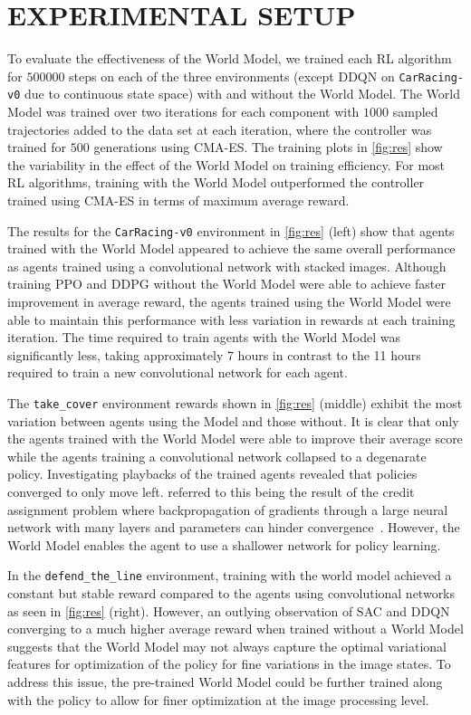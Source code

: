 \section{EXPERIMENTAL SETUP}\label{experiments}

To evaluate the effectiveness of the World Model, we trained each RL algorithm for $500000$ steps on each of the three environments (except DDQN on \texttt{CarRacing-v0} due to continuous state space) with and without the World Model. The World Model was trained over two iterations for each component with $1000$ sampled trajectories added to the data set at each iteration, where the controller was trained for $500$ generations using CMA-ES. The training plots in \cref{fig:res} show the variability in the effect of the World Model on training efficiency. For most RL algorithms, training with the World Model outperformed the controller trained using CMA-ES in terms of maximum average reward.

The results for the \texttt{CarRacing-v0} environment in \cref{fig:res} (left) show that agents trained with the World Model appeared to achieve the same overall performance as agents trained using a convolutional network with stacked images. Although training PPO and DDPG without the World Model were able to achieve faster improvement in average reward, the agents trained using the World Model were able to maintain this performance with less variation in rewards at each training iteration. The time required to train agents with the World Model was significantly less, taking approximately 7 hours in contrast to the 11 hours required to train a new convolutional network for each agent.

The \texttt{take\_cover} environment rewards shown in \cref{fig:res} (middle) exhibit the most variation between agents using the Model and those without. It is clear that only the agents trained with the World Model were able to improve their average score while the agents training a convolutional network collapsed to a degenarate policy. Investigating playbacks of the trained agents revealed that policies converged to only move left.  referred to this being the result of the credit assignment problem where backpropagation of gradients through a large neural network with many layers and parameters can hinder convergence~\cite{ha2018recurrent}. However, the World Model enables the agent to use a shallower network for policy learning.

In the \texttt{defend_the_line} environment, training with the world model achieved a constant but stable reward compared to the agents using convolutional networks as seen in \cref{fig:res} (right). However, an outlying observation of SAC and DDQN converging to a much higher average reward when trained without a World Model suggests that the World Model may not always capture the optimal variational features for optimization of the policy for fine variations in the image states. To address this issue, the pre-trained World Model could be further trained along with the policy to allow for finer optimization at the image processing level.

